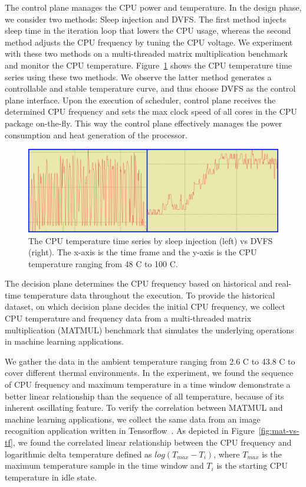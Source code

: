 The control plane manages the CPU power and temperature. In the design phase, we consider two methods: Sleep injection and DVFS. The first method injects sleep time in the iteration loop that lowers the CPU usage, whereas the second method adjusts the CPU frequency by tuning the CPU voltage. We experiment with these two methods on a multi-threaded matrix multiplication benchmark and monitor the CPU temperature. Figure~\ref{fig:sleep} shows the CPU temperature time series using these two methods. We observe the latter method generates a controllable and stable temperature curve, and thus choose DVFS as the control plane interface. Upon the execution of scheduler, control plane receives the determined CPU frequency and sets the max clock speed of all cores in the CPU package on-the-fly. This way the control plane effectively manages the power consumption and heat generation of the processor.

\begin{figure}[ht]
\includegraphics[width=\textwidth]{figures/Sleep-vs-dvfs.png}
\caption{The CPU temperature time series by sleep injection (left) vs DVFS (right). The x-axis is the time frame and the y-axis is the CPU temperature ranging from 48 \degree C to 100 \degree C. } \label{fig:sleep}
\end{figure}


The decision plane
 determines the CPU frequency based on historical and real-time temperature data throughout the execution. To provide the historical dataset, on which decision plane decides the initial CPU frequency, we collect CPU temperature and frequency data from a multi-threaded matrix multiplication (MATMUL) benchmark that simulates the underlying operations in machine learning applications. 

We gather the data in the ambient temperature ranging from 2.6 \degree C to 43.8 \degree C to cover different thermal environments. In the experiment, we found the sequence of CPU frequency and maximum temperature in a time window demonstrate a better linear relationship than the sequence of all temperature, because of its inherent oscillating feature. To verify the correlation between MATMUL and machine learning applications, we collect the same data from an image recognition application written in Tensorflow~\cite{ref:tensorflow}. As depicted in Figure~\ref{fig:mat-vs-tf}, we found the correlated linear relationship between the CPU frequency and logarithmic delta temperature defined as $log(T_{max} - T_i)$, where $T_{max}$ is the maximum temperature sample in the time window and $T_i$ is the starting CPU temperature in idle state. 
 
